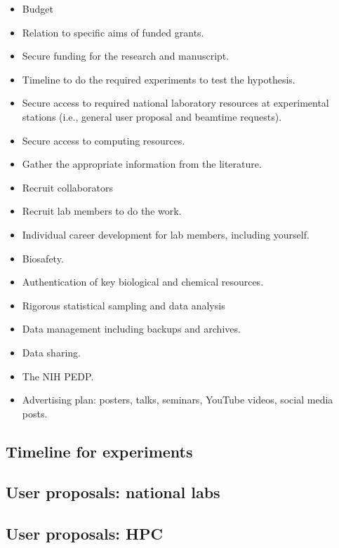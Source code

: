 \documentclass[11pt,letterpaper]{article}
\begin{document}
\begin{itemize}
\item Budget
\item Relation to specific aims of funded grants.
\item Secure funding for the research and manuscript.
\item Timeline to do the required experiments to test the hypothesis.
\item Secure access to required national laboratory resources at experimental stations (i.e., general user proposal and beamtime requests).
\item Secure access to computing resources.
\item Gather the appropriate information from the literature.
\item Recruit collaborators
\item Recruit lab members to do the work.
\item Individual career development for lab members, including yourself.
\item Biosafety.
\item Authentication of key biological and chemical resources.
\item Rigorous statistical sampling and data analysis
\item Data management including backups and archives.
\item Data sharing.
\item The NIH PEDP.
\item Advertising plan: posters, talks, seminars, YouTube videos, social media posts.
\end{itemize}




\subsection{Timeline for experiments}
\label{sec:org75779f0}


\subsection{User proposals: national labs}
\label{sec:orgdf78bb7}


\subsection{User proposals: HPC}
\label{sec:org8a101cb}
\end{document}
